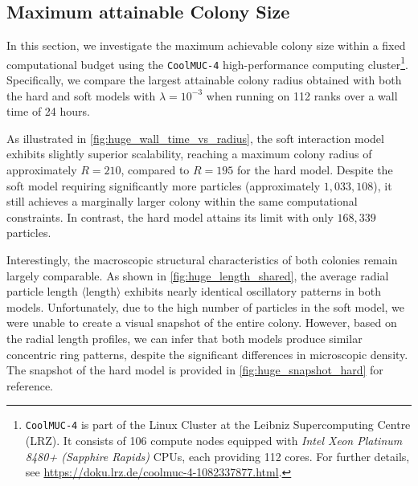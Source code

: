 \documentclass[conference]{IEEEtran}
\begin{document}
\subsection{Maximum attainable Colony Size}

In this section, we investigate the maximum achievable colony size within a fixed computational budget using the \texttt{CoolMUC-4} high-performance computing cluster\footnote{\texttt{CoolMUC-4} is part of the Linux Cluster at the Leibniz Supercomputing Centre (LRZ). It consists of 106 compute nodes equipped with \textit{Intel Xeon Platinum 8480+ (Sapphire Rapids)} CPUs, each providing 112 cores. For further details, see \url{https://doku.lrz.de/coolmuc-4-1082337877.html}.}. Specifically, we compare the largest attainable colony radius obtained with both the hard and soft models with $\lambda=10^{-3}$ when running on 112 ranks over a wall time of 24 hours.


As illustrated in \autoref{fig:huge_wall_time_vs_radius}, the soft interaction model exhibits slightly superior scalability, reaching a maximum colony radius of approximately $R = 210$, compared to $R = 195$ for the hard model. Despite the soft model requiring significantly more particles (approximately $1{,}033{,}108$), it still achieves a marginally larger colony within the same computational constraints. In contrast, the hard model attains its limit with only $168{,}339$ particles.

Interestingly, the macroscopic structural characteristics of both colonies remain largely comparable. As shown in \autoref{fig:huge_length_shared}, the average radial particle length $\langle \text{length} \rangle$ exhibits nearly identical oscillatory patterns in both models. Unfortunately, due to the high number of particles in the soft model, we were unable to create a visual snapshot of the entire colony. However, based on the radial length profiles, we can infer that both models produce similar concentric ring patterns, despite the significant differences in microscopic density. The snapshot of the hard model is provided in \autoref{fig:huge_snapshot_hard} for reference.
\end{document}
